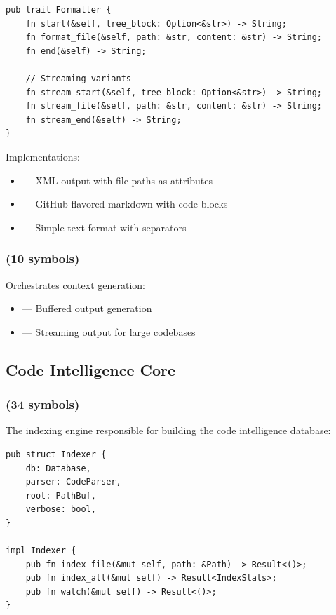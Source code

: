 \begin{lstlisting}[style=rustcode, caption={Formatter trait definition}]
pub trait Formatter {
    fn start(&self, tree_block: Option<&str>) -> String;
    fn format_file(&self, path: &str, content: &str) -> String;
    fn end(&self) -> String;
    
    // Streaming variants
    fn stream_start(&self, tree_block: Option<&str>) -> String;
    fn stream_file(&self, path: &str, content: &str) -> String;
    fn stream_end(&self) -> String;
}
\end{lstlisting}

Implementations:
\begin{itemize}
    \item {} --- XML output with file paths as attributes
    \item {} --- GitHub-flavored markdown with code blocks
    \item {} --- Simple text format with separators
\end{itemize}

\subsubsection{ (10 symbols)}

Orchestrates context generation:

\begin{itemize}
    \item {} --- Buffered output generation
    \item {} --- Streaming output for large codebases
\end{itemize}

\subsection{Code Intelligence Core}

\subsubsection{ (34 symbols)}

The indexing engine responsible for building the code intelligence database:

\begin{lstlisting}[style=rustcode, caption={Indexer structure}]
pub struct Indexer {
    db: Database,
    parser: CodeParser,
    root: PathBuf,
    verbose: bool,
}

impl Indexer {
    pub fn index_file(&mut self, path: &Path) -> Result<()>;
    pub fn index_all(&mut self) -> Result<IndexStats>;
    pub fn watch(&mut self) -> Result<()>;
}
\end{lstlisting}

